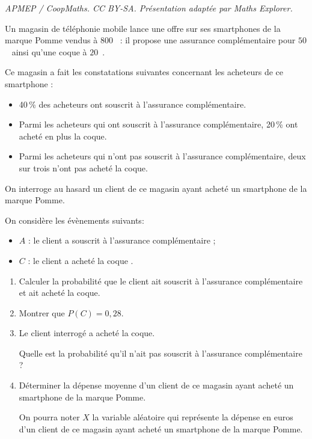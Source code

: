 \documentclass[10pt]{article}
\providecommand{\euro}{\texteuro}
\providecommand{\euro}{{\text{€}}}
\renewcommand{\euro}{\ifmmode\text{\texteuro}\else\texteuro\fi}
\begin{document}
\noindent\textit{APMEP / CoopMaths. CC BY-SA. Présentation adaptée par Maths Explorer.}\par\medskip
\medskip
Un magasin de téléphonie mobile lance une offre sur ses smartphones de la marque Pomme vendus à $800$~\euro{} : il propose une assurance complémentaire pour $50$~\euro{} ainsi qu'une coque à $20$~\euro.

Ce magasin a fait les constatations suivantes concernant les acheteurs de ce smartphone :

\setlength\parindent{9mm}
\begin{itemize}
\item[$\bullet~~$] 40\,\% des acheteurs ont souscrit à l'assurance complémentaire.
\item[$\bullet~~$] Parmi les acheteurs qui ont souscrit à l'assurance complémentaire, 20\,\% ont acheté en plus la coque.
\item[$\bullet~~$] Parmi les acheteurs qui n'ont pas souscrit à l'assurance complémentaire, deux sur trois n'ont pas acheté la coque.
\end{itemize}
\setlength\parindent{0mm}

On interroge au hasard un client de ce magasin ayant acheté un smartphone de la marque Pomme.

On considère les évènements suivants:

\setlength\parindent{9mm}
\begin{itemize}
\item[$\bullet~~$]$A$ : \og le client a souscrit à l'assurance complémentaire \fg{} ;
\item[$\bullet~~$]$C$ : \og le client a acheté la coque \fg.
\end{itemize}
\setlength\parindent{0mm}

\medskip

\begin{enumerate}
\item Calculer la probabilité que le client ait souscrit à l'assurance complémentaire et ait acheté la coque.
\item Montrer que $P(C) = 0,28$.
\item Le client interrogé a acheté la coque.

Quelle est la probabilité qu'il n'ait pas souscrit à l'assurance complémentaire ? 
\item Déterminer la dépense moyenne d'un client de ce magasin ayant acheté un smartphone de la marque Pomme.

On pourra noter $X$ la variable aléatoire qui représente la dépense en euros d'un client de ce magasin ayant acheté un smartphone de la marque Pomme.
\end{enumerate}

\bigskip
\end{document}
